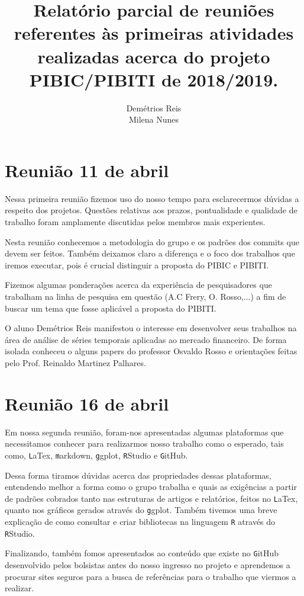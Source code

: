 \documentclass[a4paper]{article}
\title{Relatório parcial de reuniões referentes às primeiras atividades realizadas acerca do projeto PIBIC/PIBITI de 2018/2019.}
\author{Demétrios Reis \\Milena Nunes}
\begin{document}
\maketitle

\section{Reunião 11 de abril}

Nessa primeira reunião fizemos uso do nosso tempo para esclarecermos dúvidas a respeito dos projetos. Questões relativas aos prazos, pontualidade e qualidade de trabalho foram amplamente discutidas pelos membros mais experientes.

Nesta reunião conhecemos a metodologia do grupo e os padrões dos commits que devem ser feitos. Também deixamos claro a diferença e o foco dos trabalhos que iremos executar, pois é crucial distinguir a proposta do PIBIC e PIBITI.

Fizemos algumas ponderações acerca da experiência de pesquisadores que trabalham na linha de pesquisa em questão (A.C Frery, O. Rosso,...) a fim de buscar um tema que fosse aplicável a proposta do PIBITI. 

O aluno Demétrios Reis manifestou o interesse em desenvolver seus trabalhos na área de análise de séries temporais aplicadas ao mercado financeiro. De forma isolada conheceu o alguns papers do professor Osvaldo Rosso e  orientações feitas pelo Prof. Reinaldo Martinez Palhares.

\section{Reunião 16 de abril}

Em nossa segunda reunião, foram-nos apresentadas algumas plataformas que necessitamos conhecer para realizarmos nosso trabalho como o esperado, tais como, \texttt LaTex, \texttt markdown, \texttt ggplot, \texttt RStudio e \texttt GitHub. 

Dessa forma tiramos dúvidas acerca das propriedades dessas plataformas, entendendo melhor a forma como o grupo trabalha e quais as exigências a partir de padrões cobrados tanto nas estruturas de artigos e relatórios, feitos no \texttt LaTex, quanto nos gráficos gerados através do \texttt ggplot. Também tivemos uma breve explicação de como consultar e criar bibliotecas na linguagem \texttt R através do \texttt RStudio. 

Finalizando, também fomos apresentados ao conteúdo que existe no \texttt GitHub desenvolvido pelos bolsistas antes do nosso ingresso no projeto e aprendemos a procurar sites seguros para a busca de referências para o trabalho que viermos a realizar.
\end{document}
